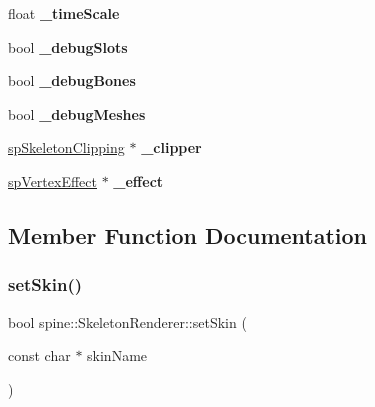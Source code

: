 \begin{DoxyCompactItemize}
float {\bfseries \+\_\+time\+Scale}
\item 
\mbox{\label{classspine_1_1SkeletonRenderer_aaa55fd2e84953dba83fd979c7b609107}} 
bool {\bfseries \+\_\+debug\+Slots}
\item 
\mbox{\label{classspine_1_1SkeletonRenderer_aeb8d7de5a74205d81eb3d0fe683ffda5}} 
bool {\bfseries \+\_\+debug\+Bones}
\item 
\mbox{\label{classspine_1_1SkeletonRenderer_a804be9b5bd15d4248b44622ed7636bb7}} 
bool {\bfseries \+\_\+debug\+Meshes}
\item 
\mbox{\label{classspine_1_1SkeletonRenderer_ab1da40d4edc4c345a4055dfd6fde3308}} 
\hyperlink{structspSkeletonClipping}{sp\+Skeleton\+Clipping} $\ast$ {\bfseries \+\_\+clipper}
\item 
\mbox{\label{classspine_1_1SkeletonRenderer_a4414895d7db63dd24c2e79555e2d9eb4}} 
\hyperlink{structspVertexEffect}{sp\+Vertex\+Effect} $\ast$ {\bfseries \+\_\+effect}
\end{DoxyCompactItemize}


\subsection{Member Function Documentation}
\mbox{\label{classspine_1_1SkeletonRenderer_ab56abe60544227f4e4ce72c1ffd463c7}} 
\subsubsection{\texorpdfstring{set\+Skin()}{setSkin()}\hspace{0.1cm}{\footnotesize\ttfamily [1/2]}}
{\footnotesize\ttfamily bool spine\+::\+Skeleton\+Renderer\+::set\+Skin (\begin{DoxyParamCaption}\item[{const char $\ast$}]{skin\+Name }\end{DoxyParamCaption})}


